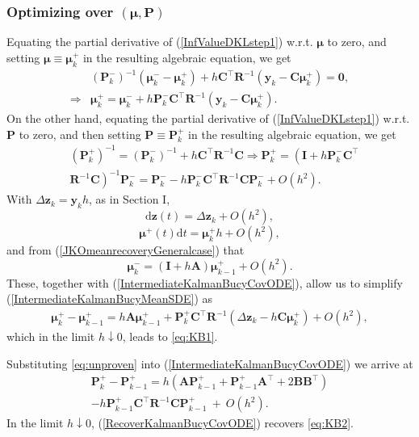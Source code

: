 \documentclass[letterpaper,10pt,twocolumn,conference]{ieeeconf}
\newcommand{\bby}{{\bm{y}}}
\newcommand{\bbz}{\bm{z}}
\newcommand{\bbmu}{\bm{\mu}}
\newcommand{\bbP}{\bm{P}}
\newcommand{\bbR}{\bm{R}}
\newcommand{\bbA}{\bm{A}}
\newcommand{\bbB}{\bm{B}}
\newcommand{\bbC}{\bm{C}}
\newcommand{\bbI}{\bm{I}}
\begin{document}
\subsubsection{Optimizing over $(\bm{\mu},\bm{P})$}
Equating the partial derivative of (\ref{InfValueDKLstep1}) w.r.t. $\bbmu$ to zero, and setting $\bbmu\equiv\bbmu_{k}^{+}$ in the resulting algebraic equation, we get
\begin{align}
&(\bbP_{k}^{-})^{-1}\left(\bbmu_{k}^{-} - \bbmu_{k}^{+}\right) + h\bbC^{\top}\bbR^{-1}\left(\bby_{k} - \bbC\bbmu_{k}^{+}\right) = \bm{0}, \nonumber\\
\Rightarrow &\bbmu_{k}^{+} = \bbmu_{k}^{-} + h\bbP_{k}^{-}\bbC^{\top}\bbR^{-1}\left(\bby_{k}-\bbC\bbmu_{k}^{+}\right).
\label{IntermediateKalmanBucyMeanSDE}	
\end{align}
On the other hand, equating the partial derivative of (\ref{InfValueDKLstep1}) w.r.t. $\bbP$ to zero, and then setting $\bbP\equiv\bbP_{k}^{+}$ in the resulting algebraic equation, we get
{\small{\begin{align}
&(\bbP_{k}^{+})^{-1} = (\bbP_{k}^{-})^{-1} + h\bbC^{\top}\bbR^{-1}\bbC \Rightarrow \bbP_{k}^{+} = \left(\bbI + h\bbP_{k}^{-}\bbC^{\top}\right.\nonumber\\
&\left.\bbR^{-1}\bbC\right)^{-1}\bbP_{k}^{-} = \bbP_{k}^{-} - h\bbP_{k}^{-}\bbC^{\top}\bbR^{-1}\bbC\bbP_{k}^{-} + O(h^{2}).
\label{IntermediateKalmanBucyCovODE}	
\end{align}}}
\hspace*{-6pt}
With $\Delta\bbz_{k} = \bby_{k}h$, as in Section I,
\[
\mathrm{d}\bbz(t) = \Delta\bbz_{k} + O(h^{2}),
\]
\[
\bbmu^{+}(t)\mathrm{d}t = \bbmu^{+}_{k} h + O(h^{2}),
\]
 and from (\ref{JKOmeanrecoveryGeneralcase}) that 
 \[
 \bbmu_{k}^{-} = (\bbI + h\bbA)\bbmu_{k-1}^{+} + O(h^{2})
.
\]
 These, together with (\ref{IntermediateKalmanBucyCovODE}), allow us to simplify (\ref{IntermediateKalmanBucyMeanSDE}) as
{\small{\begin{eqnarray*}
\bbmu_{k}^{+} \!\!-\! \bbmu_{k-1}^{+} = h\bbA\bbmu_{k-1}^{+} + \bbP_{k}^{+}\bbC^{\top}\bbR^{-1}\left(\Delta\bbz_{k} - h\bbC\bbmu_{k}^{+}\right) + O(h^{2}),
\end{eqnarray*}}}
\hspace*{-6pt}
which in the limit $h\downarrow 0$, leads to \eqref{eq:KB1}.

Substituting \eqref{eq:unproven} into (\ref{IntermediateKalmanBucyCovODE}) we arrive at
\begin{eqnarray}
\bbP_{k}^{+} - \bbP_{k-1}^{+} = h(\bbA\bbP_{k-1}^{+} + \bbP_{k-1}^{+}\bbA^{\top} + 2\bbB\bbB^{\top}) \nonumber\\
- h\bbP_{k-1}^{+}\bbC^{\top}\bbR^{-1}\bbC\bbP_{k-1}^{+} \:+\: O(h^{2}).
\label{RecoverKalmanBucyCovODE}		
\end{eqnarray}
In the limit $h\downarrow 0$, (\ref{RecoverKalmanBucyCovODE}) recovers  \eqref{eq:KB2}.
\end{document}
